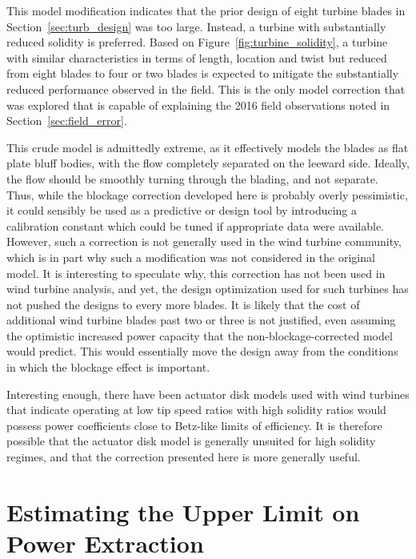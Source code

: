 This model modification indicates that the prior design of eight
turbine blades in Section~\ref{sec:turb_design} was too large. Instead,
a turbine with substantially reduced solidity is preferred. Based on
Figure~\ref{fig:turbine_solidity}, a turbine with similar
characteristics in terms of length, location and twist but reduced from
eight blades to four or two blades is expected to mitigate the
substantially reduced performance observed in the field. 
This is the only model correction that was explored that is
capable of explaining the 2016 field observations noted in
Section~\ref{sec:field_error}.  

This crude model is admittedly extreme, as it effectively models the
blades as flat plate bluff bodies, with the flow completely
separated on the leeward side. Ideally, the flow should be smoothly
turning through the blading, and not separate. Thus, while the blockage
correction developed here is probably overly pessimistic, it could
sensibly be used as a predictive or design tool by introducing a
calibration constant which could be tuned if appropriate data were
available. However, such a correction is not generally used in the wind
turbine community, which is in part why such a modification was not
considered in the original model. It is interesting to speculate why,
this correction has not been used in wind turbine analysis, and yet, the
design optimization used for such turbines has not pushed the designs to
every more blades. It is likely that the cost of additional wind turbine
blades past two or three is not justified, even assuming the optimistic
increased power capacity that the non-blockage-corrected model would
predict. This would essentially move the design away from the conditions 
in which the blockage effect is important. 

Interesting enough, there have been actuator disk models used with wind
turbines that indicate operating at low tip speed ratios with high
solidity ratios would possess power coefficients close to Betz-like
limits of efficiency\cite{WE:WE118}. It is therefore possible that the
actuator disk model is generally unsuited for high solidity regimes, and
that the correction presented here is more generally useful. 


\section{Estimating the Upper Limit on Power Extraction}
\label{sec:peak_estimate}

